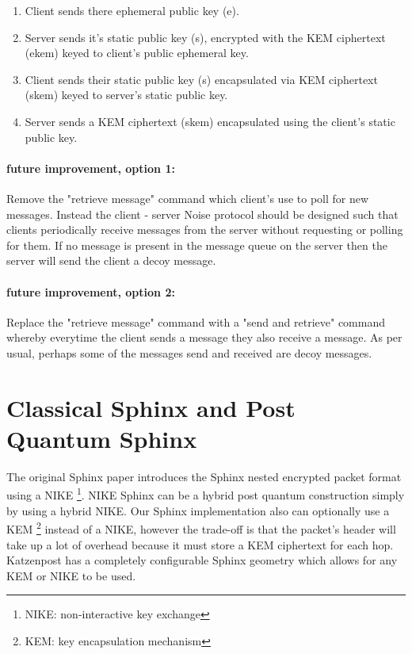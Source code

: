 \documentclass{article}
\begin{document}
\vspace{.5cm}

\begin{enumerate}
    \item Client sends there ephemeral public key (e).
    \item Server sends it's static public key (s), encrypted with the KEM ciphertext (ekem) keyed to client's public ephemeral key.
    \item Client sends their static public key (s) encapsulated via KEM ciphertext (skem) keyed to server's static public key.
    \item Server sends a KEM ciphertext (skem) encapsulated using the client's static public key.
\end{enumerate}\bigskip

\vspace{1cm}

\paragraph{future improvement, option 1:}Remove the "retrieve message" command which client's use to poll for new messages. Instead the client - server Noise protocol should be designed such that clients periodically receive messages from the server without requesting or polling for them. If no message is present in the message queue on the server then the server will send the client a decoy message.

\paragraph{future improvement, option 2:}Replace the "retrieve message" command with a "send and retrieve" command whereby everytime the client sends a message they also receive a message. As per usual, perhaps some of the messages send and received are decoy messages.


\pagebreak
 
\section{Classical Sphinx and Post Quantum Sphinx}

The original Sphinx paper  introduces the Sphinx nested encrypted packet format
using a NIKE \footnote{NIKE: non-interactive key exchange}. NIKE Sphinx can be a hybrid post quantum construction simply by using a hybrid NIKE.
Our Sphinx implementation also can optionally use a KEM \footnote{KEM: key encapsulation mechanism} instead of a NIKE, however the trade-off is that
the packet's header will take up a lot of overhead because it must store a KEM ciphertext for each hop.
Katzenpost has a completely configurable Sphinx geometry which allows for any KEM or NIKE to be used.
\end{document}
